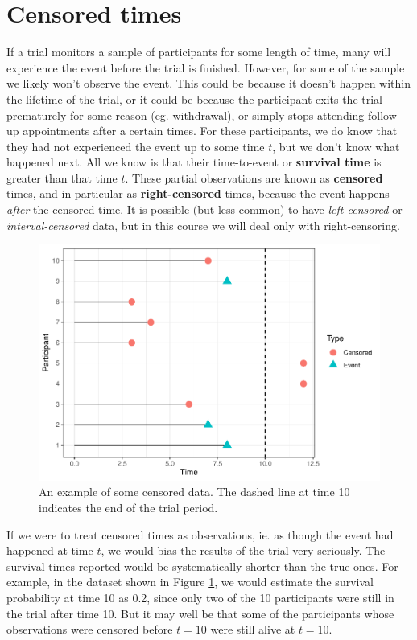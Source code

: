 \documentclass[
  openany]{book}
\theoremstyle{definition}
\theoremstyle{definition}
\theoremstyle{definition}
\theoremstyle{definition}
\theoremstyle{remark}
\begin{document}
\section{Censored times}\label{censored-times}

If a trial monitors a sample of participants for some length of time, many will experience the event before the trial is finished. However, for some of the sample we likely won't observe the event. This could be because it doesn't happen within the lifetime of the trial, or it could be because the participant exits the trial prematurely for some reason (eg. withdrawal), or simply stops attending follow-up appointments after a certain times. For these participants, we do know that they had not experienced the event up to some time \(t\), but we don't know what happened next. All we know is that their time-to-event or \textbf{survival time} is greater than that time \(t\). These partial observations are known as \textbf{censored} times, and in particular as \textbf{right-censored} times, because the event happens \emph{after} the censored time. It is possible (but less common) to have \emph{left-censored} or \emph{interval-censored} data, but in this course we will deal only with right-censoring.

\begin{figure}
\centering
\includegraphics{CT4H_notes_files/figure-latex/censor-1.pdf}
\caption{\label{fig:censor}An example of some censored data. The dashed line at time 10 indicates the end of the trial period.}
\end{figure}

If we were to treat censored times as observations, ie. as though the event had happened at time \(t\), we would bias the results of the trial very seriously. The survival times reported would be systematically shorter than the true ones. For example, in the dataset shown in Figure \ref{fig:censor}, we would estimate the survival probability at time 10 as 0.2, since only two of the 10 participants were still in the trial after time 10. But it may well be that some of the participants whose observations were censored before \(t=10\) were still alive at \(t=10\).
\end{document}
